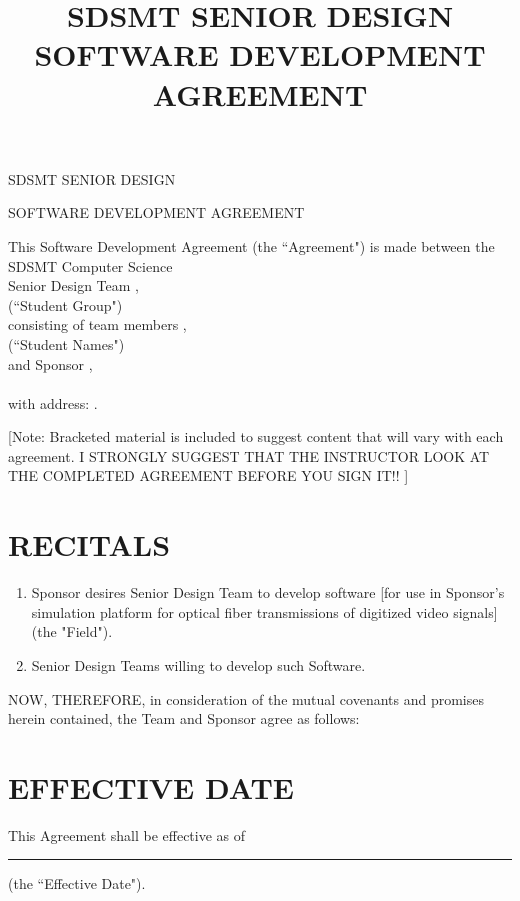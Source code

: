 \documentclass[11pt]{article}
\title{SDSMT SENIOR DESIGN SOFTWARE DEVELOPMENT AGREEMENT}
\begin{document}


{\Large \bf 
\centerline{SDSMT SENIOR DESIGN}\centerline{SOFTWARE DEVELOPMENT AGREEMENT}
}
\vspace{\baselineskip}

This Software Development Agreement (the ``Agreement") is made between the SDSMT  Computer Science\\[3mm] Senior Design Team  \hrulefill, \\[-1mm]  \hspace*{9cm} {\footnotesize (``Student Group")}\\[3mm]
consisting of team members  \hrulefill,  \\[-1mm]  \hspace*{9cm} {\footnotesize (``Student Names")}\\[3mm]
 and  Sponsor \hrulefill,  \\[-1mm]  \hspace*{9cm}{\footnotesize  (``Company Name")} \\[3mm]
 with address: \hrulefill . 

[Note: Bracketed material is included to suggest content that will vary with each agreement. I STRONGLY SUGGEST THAT THE INSTRUCTOR LOOK AT THE COMPLETED AGREEMENT BEFORE YOU SIGN IT!!  ]  \vspace{4mm}


\section{RECITALS}
\begin{enumerate}  \itemsep4pt \parskip0pt 
\item Sponsor desires Senior Design Team to develop software [for use in       Sponsor's simulation platform for optical fiber transmissions of       digitized video signals] (the "Field").    

\item Senior Design Teams willing to develop such Software.  
\end{enumerate}
NOW, THEREFORE, in consideration of the mutual covenants and promises herein contained, the Team and Sponsor agree as follows:  

\section{EFFECTIVE DATE }

This Agreement shall be effective as of \rule{4cm}{0.4pt}  (the ``Effective Date").  
\end{document}
